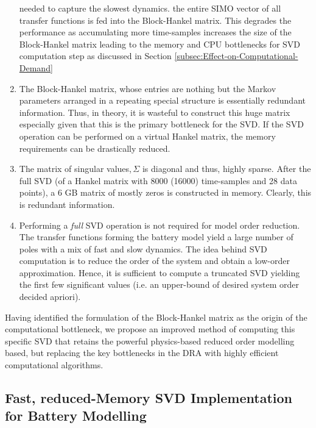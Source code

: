 \begin{enumerate}
needed to capture the slowest dynamics. the entire SIMO vector of
all transfer functions is fed into the Block-Hankel matrix. This degrades
the performance as accumulating more time-samples increases the size
of the Block-Hankel matrix leading to the memory and CPU bottlenecks
for SVD computation step as discussed in Section \ref{subsec:Effect-on-Computational-Demand}
\item The Block-Hankel matrix, whose entries are nothing but the Markov
parameters arranged in a repeating special structure is essentially
redundant information. Thus, in theory, it is wasteful to construct
this huge matrix especially given that this is the primary bottleneck
for the SVD. If the SVD operation can be performed on a virtual Hankel
matrix, the memory requirements can be drastically reduced.
\item The matrix of singular values,$\,\Sigma$ is diagonal and thus, highly
sparse. After the full SVD (of a Hankel matrix with 8000 (16000) time-samples
and 28 data points), a 6 GB matrix of mostly zeros is constructed
in memory. Clearly, this is redundant information.
\item Performing a \textit{full} SVD operation is not required for model
order reduction. The transfer functions forming the battery model
yield a large number of poles with a mix of fast and slow dynamics.
The idea behind SVD computation is to reduce the order of the system
and obtain a low-order approximation. Hence, it is sufficient to compute
a truncated SVD yielding the first few significant values (i.e. an
upper-bound of desired system order decided apriori).
\end{enumerate}
Having identified the formulation of the Block-Hankel matrix as the
origin of the computational bottleneck, we propose an improved method
of computing this specific SVD that retains the powerful physics-based
reduced order modelling based, but replacing the key bottlenecks in
the DRA with highly efficient computational algorithms.

\subsection{Fast, reduced-Memory SVD Implementation for Battery Modelling}

